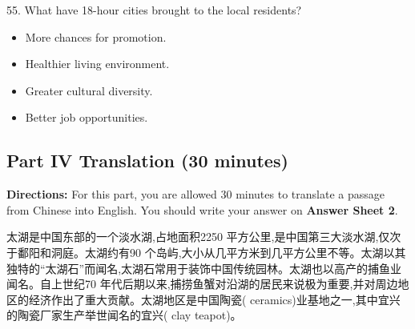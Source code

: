\documentclass[UTF8,11pt]{ctexart}
\begin{document}
55. What have 18-hour cities brought to the local residents?


\begin{itemize}[leftmargin=2em,itemsep=.2em,topsep=.4em]\item[A.] More chances for promotion.
\item[B.] Healthier living environment.
\item[C.] Greater cultural diversity.
\item[D.] Better job opportunities.
\end{itemize}

\subsection*{\textbf{Part IV} \textbf{Translation} \textbf{(30 minutes)}}


\textbf{Directions:} For this part, you are allowed 30 minutes to translate a passage from Chinese into English. You should write your answer on\textbf{ Answer Sheet 2}.


太湖是中国东部的一个淡水湖,占地面积2250 平方公里,是中国第三大淡水湖,仅次于鄱阳和洞庭。太湖约有90 个岛屿,大小从几平方米到几平方公里不等。太湖以其独特的“太湖石”而闻名,太湖石常用于装饰中国传统园林。太湖也以高产的捕鱼业闻名。自上世纪70 年代后期以来,捕捞鱼蟹对沿湖的居民来说极为重要,并对周边地区的经济作出了重大贡献。太湖地区是中国陶瓷( ceramics)业基地之一,其中宜兴的陶瓷厂家生产举世闻名的宜兴( clay teapot)。
\end{document}
